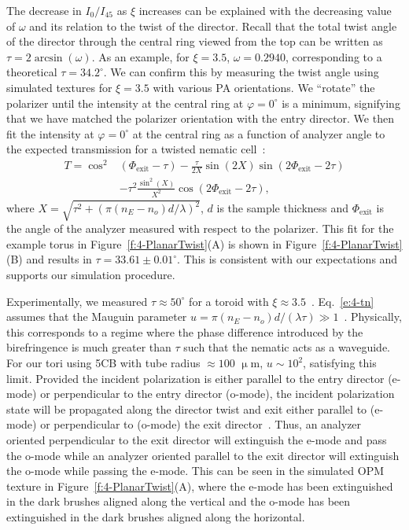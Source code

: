 The decrease in $I_0/I_{45}$ as $\xi$ increases can be explained with the decreasing value of $\omega$ and its relation to the twist of the director.
Recall that the total twist angle of the director through the central ring viewed from the top can be written as $\tau = 2 \arcsin (\omega)$.
As an example, for $\xi = 3.5$, $\omega = 0.2940$, corresponding to a theoretical $\tau = 34.2^{\circ}$.
We can confirm this by measuring the twist angle using simulated textures for $\xi=3.5$ with various PA orientations.
We ``rotate'' the polarizer until the intensity at the central ring at $\varphi=0^{\circ}$ is a minimum, signifying that we have matched the polarizer orientation with the entry director.
We then fit the intensity at $\varphi=0^{\circ}$ at the central ring as a function of analyzer angle to the expected transmission for a twisted nematic cell~\cite{RN232}:
\begin{align}\label{e:4-tn}
T = \cos ^2&(\Phi_{\textrm{exit}}-\tau)-\frac{\tau}{2 X}\sin(2X)\sin(2\Phi_{\textrm{exit}}-2\tau)\nonumber \\
&-\tau ^2\frac{\sin ^2 (X)}{X^2}\cos(2\Phi_{\textrm{exit}}-2\tau),
\end{align}
where $X = \sqrt{\tau^2+(\pi(n_E-n_o)d/\lambda)^2}$, $d$ is the sample thickness and $\Phi_\textrm{exit}$ is the angle of the analyzer measured with respect to the polarizer.
This fit for the example torus in Figure~\ref{f:4-PlanarTwist}(A) is shown in Figure~\ref{f:4-PlanarTwist}(B) and results in $\tau=33.61 \pm 0.01^{\circ}$.
This is consistent with our expectations and supports our simulation procedure.

Experimentally, we measured $\tau \approx 50^{\circ}$ for a toroid with $\xi \approx 3.5$~\cite{RN24}. Eq.~\ref{e:4-tn} assumes that the Mauguin parameter $u =  \pi (n_E-n_o) d /(\lambda \tau) \gg 1$~\cite{RN232}.
 Physically, this corresponds to a regime where the phase difference introduced by the birefringence is much greater than $\tau$ such that the nematic acts as a waveguide.
For our tori using 5CB with tube radius $\approx 100$ $\upmu$m, $u\sim 10^{2}$, satisfying this limit.
Provided the incident polarization is either parallel to the entry director (e-mode) or perpendicular to the entry director (o-mode), the incident polarization state will be propagated along the director twist and exit either parallel to (e-mode) or perpendicular to (o-mode) the exit director~\cite{RN232}.
Thus, an analyzer oriented perpendicular to the exit director will extinguish the e-mode and pass the o-mode while an analyzer oriented parallel to the exit director will extinguish the o-mode while passing the e-mode.
This can be seen in the simulated OPM texture in Figure~\ref{f:4-PlanarTwist}(A), where the e-mode has been extinguished in the dark brushes aligned along the vertical and the o-mode has been extinguished in the dark brushes aligned along the horizontal.


